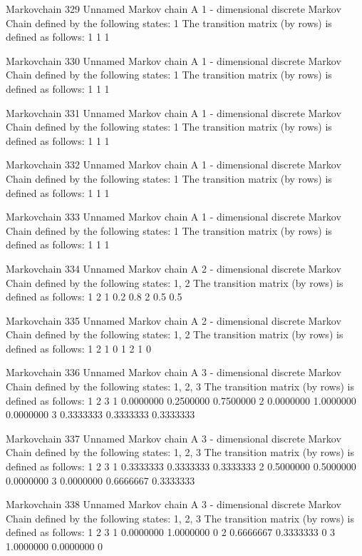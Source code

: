 \documentclass[
  nojss]{jss}
\begin{document}
\begin{CodeChunk}
\begin{CodeOutput}
Markovchain  329 
Unnamed Markov chain 
 A  1 - dimensional discrete Markov Chain defined by the following states: 
 1 
 The transition matrix  (by rows)  is defined as follows: 
  1
1 1

Markovchain  330 
Unnamed Markov chain 
 A  1 - dimensional discrete Markov Chain defined by the following states: 
 1 
 The transition matrix  (by rows)  is defined as follows: 
  1
1 1

Markovchain  331 
Unnamed Markov chain 
 A  1 - dimensional discrete Markov Chain defined by the following states: 
 1 
 The transition matrix  (by rows)  is defined as follows: 
  1
1 1

Markovchain  332 
Unnamed Markov chain 
 A  1 - dimensional discrete Markov Chain defined by the following states: 
 1 
 The transition matrix  (by rows)  is defined as follows: 
  1
1 1

Markovchain  333 
Unnamed Markov chain 
 A  1 - dimensional discrete Markov Chain defined by the following states: 
 1 
 The transition matrix  (by rows)  is defined as follows: 
  1
1 1

Markovchain  334 
Unnamed Markov chain 
 A  2 - dimensional discrete Markov Chain defined by the following states: 
 1, 2 
 The transition matrix  (by rows)  is defined as follows: 
    1   2
1 0.2 0.8
2 0.5 0.5

Markovchain  335 
Unnamed Markov chain 
 A  2 - dimensional discrete Markov Chain defined by the following states: 
 1, 2 
 The transition matrix  (by rows)  is defined as follows: 
  1 2
1 0 1
2 1 0

Markovchain  336 
Unnamed Markov chain 
 A  3 - dimensional discrete Markov Chain defined by the following states: 
 1, 2, 3 
 The transition matrix  (by rows)  is defined as follows: 
          1         2         3
1 0.0000000 0.2500000 0.7500000
2 0.0000000 1.0000000 0.0000000
3 0.3333333 0.3333333 0.3333333

Markovchain  337 
Unnamed Markov chain 
 A  3 - dimensional discrete Markov Chain defined by the following states: 
 1, 2, 3 
 The transition matrix  (by rows)  is defined as follows: 
          1         2         3
1 0.3333333 0.3333333 0.3333333
2 0.5000000 0.5000000 0.0000000
3 0.0000000 0.6666667 0.3333333

Markovchain  338 
Unnamed Markov chain 
 A  3 - dimensional discrete Markov Chain defined by the following states: 
 1, 2, 3 
 The transition matrix  (by rows)  is defined as follows: 
          1         2 3
1 0.0000000 1.0000000 0
2 0.6666667 0.3333333 0
3 1.0000000 0.0000000 0


\end{CodeOutput}
\end{CodeChunk}
\end{document}
